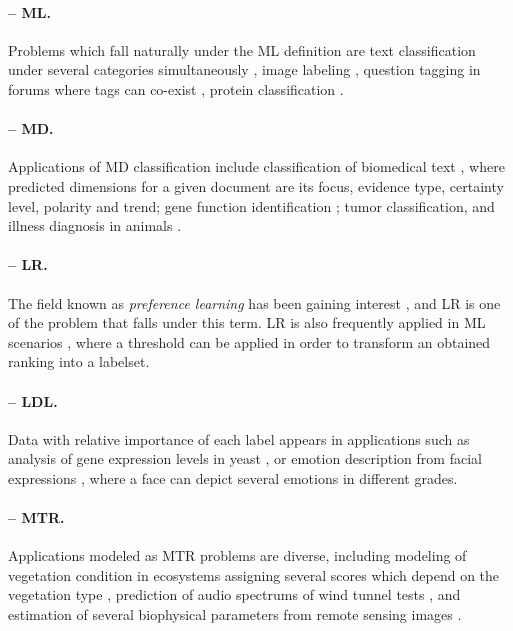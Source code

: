 \documentclass[
	fontsize=11pt, %
	twoside=false, %
	open=any, %
	secnumdepth=1, %
]{kaobook}
\begin{document}
\paragraph{-- ML.} Problems which fall naturally under the ML definition are text classification under several categories simultaneously \cite{aml-text}, image labeling \cite{aml-scene}, question tagging in forums where tags can co-exist \cite{aml-question}, protein classification \cite{aml-protein}.

\paragraph{-- MD.} Applications of MD classification include classification of biomedical text \cite{mdc}, where predicted dimensions for a given document are its focus, evidence type, certainty level, polarity and trend; gene function identification \cite{md-bayes}; tumor classification, and illness diagnosis in animals \cite{md-bayes2}.

\paragraph{-- LR.} The field known as \emph{preference learning} has been gaining interest \cite{lrankpairwise}, and LR is one of the problem that falls under this term. LR is also frequently applied in ML scenarios \cite{lrank4ml}, where a threshold can be applied in order to transform an obtained ranking into a labelset.

\paragraph{-- LDL.} Data with relative importance of each label appears in applications such as analysis of gene expression levels in yeast \cite{aldl-yeast}, or emotion description from facial expressions \cite{aldl-face}, where a face can depict several emotions in different grades.

\paragraph{-- MTR.} Applications modeled as MTR problems are diverse, including modeling of vegetation condition in ecosystems assigning several scores which depend on the vegetation type \cite{amtr-eco}, prediction of audio spectrums of wind tunnel tests \cite{amtr-wind}, and estimation of several biophysical parameters from remote sensing images \cite{amtr-remote}.
\end{document}
